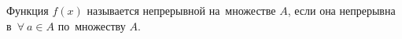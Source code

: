 
Функция $f(x)$ называется непрерывной на~множестве $A$, если она непрерывна в~$\forall\  a\in A$ по~множеству $A$.
